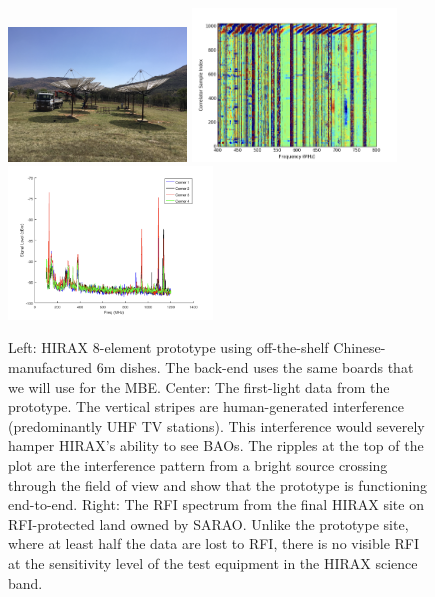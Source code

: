 \documentclass[letterpaper,11pt,preprint]{aastex}
\newcommand{\mbe}{{\rm MBE}}
\begin{document}
\begin{figure}[tbh]
  \includegraphics[height=1.4in]{hirax8.png}
  \includegraphics[height=1.6in]{first_fringe.png}
  \includegraphics[height=1.6in]{hirax_site_rfi.png} 
\caption{\small Left: HIRAX 8-element prototype using off-the-shelf
  Chinese-manufactured 6m dishes.  The back-end uses the same boards
  that we will use for the \mbe.  Center:  The first-light data from
  the prototype.  The vertical stripes are human-generated
  interference (predominantly UHF TV stations). This interference
  would severely hamper HIRAX's ability to see BAOs.  The ripples at
  the top of the plot are the interference pattern from a bright
  source crossing through the field of view and show that the
  prototype is functioning end-to-end.  Right:  The RFI spectrum from
  the final HIRAX site on RFI-protected land owned by SARAO.  Unlike
  the prototype site, where at least half the data are lost to RFI,
  there is no visible RFI at the sensitivity level of the test
  equipment in the HIRAX science band.
  \label{fig:hirax8}
}
\end{figure}
\end{document}
